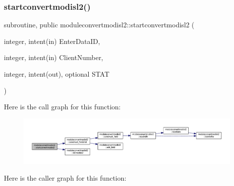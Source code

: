 \subsubsection{\texorpdfstring{startconvertmodisl2()}{startconvertmodisl2()}}
{\footnotesize\ttfamily subroutine, public moduleconvertmodisl2\+::startconvertmodisl2 (\begin{DoxyParamCaption}\item[{integer, intent(in)}]{Enter\+Data\+ID,  }\item[{integer, intent(in)}]{Client\+Number,  }\item[{integer, intent(out), optional}]{S\+T\+AT }\end{DoxyParamCaption})}

Here is the call graph for this function\+:\nopagebreak
\begin{figure}[H]
\begin{center}
\leavevmode
\includegraphics[width=350pt]{namespacemoduleconvertmodisl2_aa38d6c70d36fe4b61950bdeaf7f6ff18_cgraph}
\end{center}
\end{figure}
Here is the caller graph for this function\+:\nopagebreak

